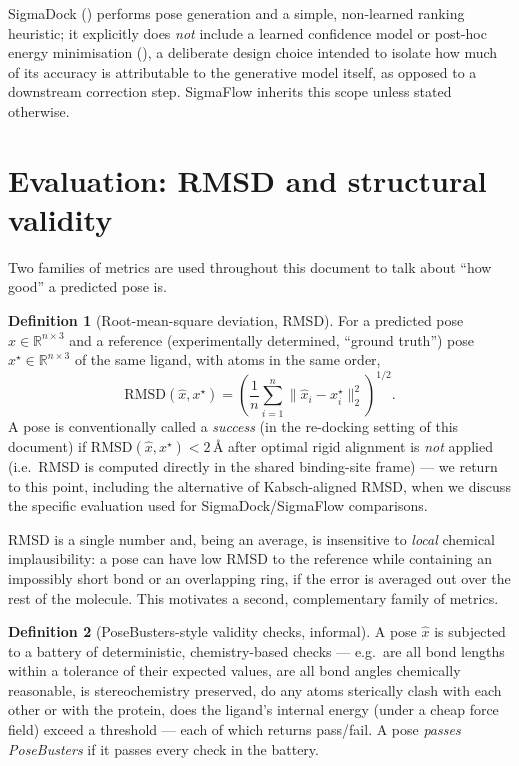\documentclass[11pt,a4paper]{report}
\theoremstyle{definition}
\newtheorem{definition}[definition]{Definition}
\theoremstyle{remark}
\newcommand{\RR}{\mathbb R}
\begin{document}
SigmaDock () performs pose generation and a simple,
non-learned ranking heuristic; it explicitly does \emph{not} include a
learned confidence model or post-hoc energy minimisation
(), a deliberate design choice intended to
isolate how much of its accuracy is attributable to the generative model
itself, as opposed to a downstream correction step. SigmaFlow inherits this
scope unless stated otherwise.

\section{Evaluation: RMSD and structural validity}
\label{sec:evaluation}

Two families of metrics are used throughout this document to talk about
``how good'' a predicted pose is.

\begin{definition}[Root-mean-square deviation, RMSD]
\label{def:rmsd}
For a predicted pose $\hat x \in \RR^{n\times3}$ and a reference (experimentally
determined, ``ground truth'') pose $x^\star \in \RR^{n\times3}$ of the same
ligand, with atoms in the same order,
\[
\mathrm{RMSD}(\hat x, x^\star)
=
\left(
\frac1n \sum_{i=1}^n \|\hat x_i - x^\star_i\|_2^2
\right)^{1/2} .
\]
A pose is conventionally called a \emph{success} (in the re-docking
setting of this document) if $\mathrm{RMSD}(\hat x, x^\star) < 2\,$\r A after
optimal rigid alignment is \emph{not} applied (i.e.\ RMSD is computed
directly in the shared binding-site frame) --- we return to this point,
including the alternative of Kabsch-aligned RMSD, when we discuss the
specific evaluation used for SigmaDock/SigmaFlow comparisons.
\end{definition}

RMSD is a single number and, being an average, is insensitive to
\emph{local} chemical implausibility: a pose can have low RMSD to the
reference while containing an impossibly short bond or an overlapping ring,
if the error is averaged out over the rest of the molecule. This motivates a
second, complementary family of metrics.

\begin{definition}[PoseBusters-style validity checks, informal]
\label{def:posebusters}
A pose $\hat x$ is subjected to a battery of deterministic, chemistry-based
checks --- e.g.\ are all bond lengths within a tolerance of their expected
values, are all bond angles chemically reasonable, is stereochemistry
preserved, do any atoms sterically clash with each other or with the
protein, does the ligand's internal energy (under a cheap force field)
exceed a threshold --- each of which returns pass/fail. A pose
\emph{passes PoseBusters} if it passes every check in the battery.
\end{definition}
\end{document}
